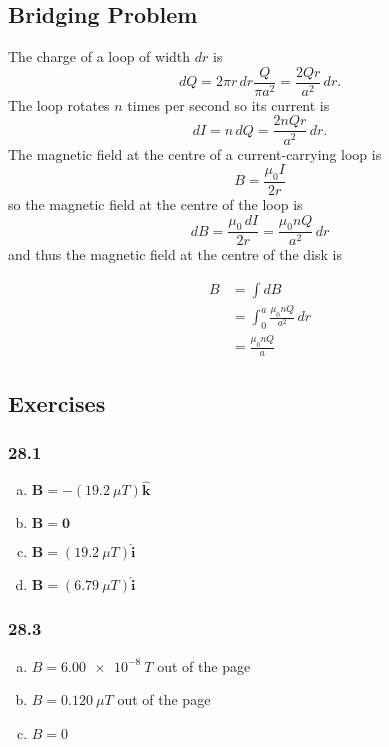 \documentclass{article}
\begin{document}
\subsection{Bridging Problem}

The charge of a loop of width $dr$ is \[dQ = 2 \pi r \,dr \frac{Q}{\pi a^2} = \frac{2 Q r}{a^2} \,dr.\] The loop rotates $n$ times per second so its current is \[dI = n \,dQ = \frac{2 n Q r}{a^2} \,dr.\] The magnetic field at the centre of a current-carrying loop is \[B = \frac{\mu_0 I}{2 r}\] so the magnetic field at the centre of the loop is \[dB = \frac{\mu_0 \,dI}{2 r} = \frac{\mu_0 n Q}{a^2} \,dr\] and thus the magnetic field at the centre of the disk is

\begin{align*}
  B & = \int dB                             \\
    & = \int_0^a \frac{\mu_0 n Q}{a^2} \,dr \\
    & = \frac{\mu_0 n Q}{a}
\end{align*}

\subsection{Exercises}

\subsubsection{28.1}

\begin{enumerate}[(a)]
  \item $\mathbf{B} = -(\qty{19.2}{\mu T}) \hat{\mathbf{k}}$

  \item $\mathbf{B} = \mathbf{0}$

  \item $\mathbf{B} = (\qty{19.2}{\mu T}) \hat{\mathbf{i}}$

  \item $\mathbf{B} = (\qty{6.79}{\mu T}) \hat{\mathbf{i}}$
\end{enumerate}

\subsubsection{28.3}

\begin{enumerate}[(a)]
  \item $B = \qty{6.00e-8}{T}$ out of the page

  \item $B = \qty{0.120}{\mu T}$ out of the page

  \item $B = 0$
\end{enumerate}
\end{document}

